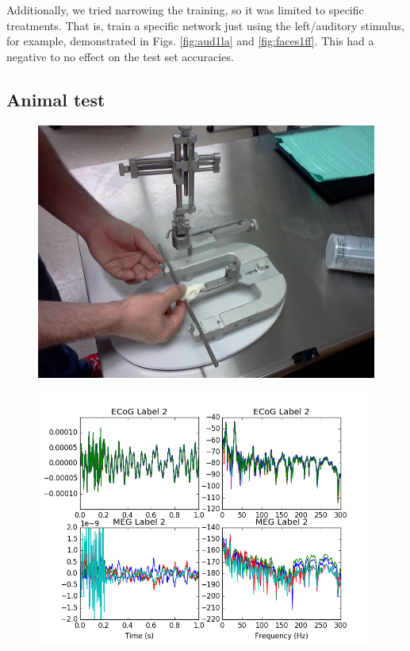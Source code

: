 \documentclass[journal,12pt,onecolumn,draftclsnofoot]{IEEEtran}
\begin{document}
Additionally, we tried narrowing the training, so it was limited to specific treatments. That is, train a specific network just using the left/auditory stimulus, for example, demonstrated in Figs. \ref{fig:aud1la} and \ref{fig:faces1ff}. This had a negative to no effect on the test set accuracies.

\subsection{Animal test}

\begin{figure}[h!]
\centering
\includegraphics[width=5in]{finalplots/stereotax1}
\caption{}
\label{fig:stereotax1}
\end{figure}

\begin{figure}[h!]
\centering
\includegraphics[width=5in]{finalplots/norat5dbpink}
\caption{}
\label{fig:norat5dbpink}
\end{figure}
\end{document}
